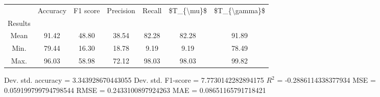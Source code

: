 \begin{tabular}{|c|c|c|c|c|c|c|}
\toprule
{} &  Accuracy &  F1 score &  Precision &  Recall &  \$T\_\{\textbackslash mu\}\$ &  \$T\_\{\textbackslash gamma\}\$ \\
Results &           &           &            &         &            &               \\
\hline
Mean    &     91.42 &     48.80 &      38.54 &   82.28 &      82.28 &         91.89 \\
Min.    &     79.44 &     16.30 &      18.78 &    9.19 &       9.19 &         78.49 \\
Max.    &     96.03 &     58.98 &      72.12 &   98.03 &      98.03 &         99.82 \\
\bottomrule
\end{tabular}

 Dev. std. accuracy = 3.343928670443055
 Dev. std. F1-score = 7.7730142282894175
 $R^2$ = -0.2886114338377934
 MSE = 0.059199799794798544
 RMSE = 0.2433100897924263
 MAE = 0.08651165791718421